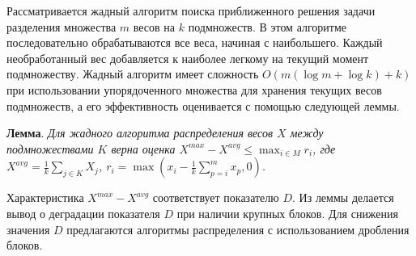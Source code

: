 \documentclass[a4paper,14pt]{extarticle}                     %
\theoremstyle{plain}                                         %
\begin{document}
Рассматривается жадный алгоритм поиска приближенного решения задачи разделения множества $m$ весов на $k$ подмножеств.
В этом алгоритме последовательно обрабатываются все веса, начиная с наибольшего.
Каждый необработанный вес добавляется к наиболее легкому на текущий момент подмножеству.
Жадный алгоритм имеет сложность $O(m(\log m + \log k) + k)$ при использовании упорядоченного множества для хранения текущих весов подмножеств, а его эффективность оценивается с помощью следующей леммы.

\textbf{Лемма}. \textit{Для жадного алгоритма распределения весов $X$ между подмножествами $K$ верна оценка $X^{max} - X^{avg} \le \max_{i \in M}{r_i}$, где $X^{avg} = \frac{1}{k}\sum_{j \in K}{X_j}$, $r_i = \max{( x_i - \frac{1}{k} \sum_{p = i}^{m}{x_p}, 0)}$.}

Характеристика $X^{max} - X^{avg}$ соответствует показателю $D$.
Из леммы делается вывод о деградации показателя $D$ при наличии крупных блоков.
Для снижения значения $D$ предлагаются алгоритмы распределения с использованием дробления блоков.
\end{document}
